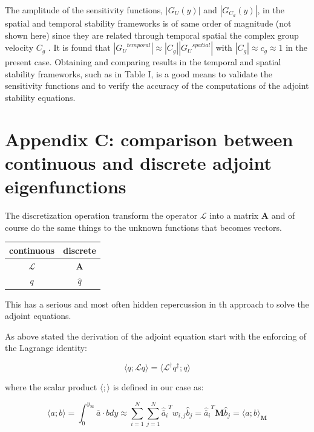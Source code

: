The amplitude of the sensitivity functions, $|G_{U} ( y)|$ and $|G_{C_d} (y)|$, in the spatial and temporal
stability frameworks is of same order of magnitude (not shown here) since they are related through
temporal spatial the complex group velocity $C_g$ . It is found that $|{G_U}^{temporal}| \approx |C_g ||{G_U}^{spatial}|$ with $|C_g | \approx c_g \approx 1$ in the
present case.
Obtaining and comparing results in the temporal and spatial stability frameworks, such as in
Table I, is a good means to validate the sensitivity functions and to verify the accuracy of the
computations of the adjoint stability equations.


\section*{Appendix C: comparison between continuous and discrete adjoint eigenfunctions}

The discretization operation transform the operator $\mathcal{L}$ into a matrix $\mathbf{A}$ and of course do the same things to the unknown functions that becomes vectors.

\begin{table}[H]
	\begin{center}
		\begin{tabular}{|c|c|}
			\hline 
			continuous & discrete \\ 
			\hline 
			$\mathcal{L}$ & $\mathbf{A}$ \\ 
			\hline 
			$q$ & $\hat{q}$ \\ 
			\hline 
		\end{tabular} 
	\end{center}
\end{table}

This has a serious and most often hidden repercussion in th approach to solve the adjoint equations.

As above stated the derivation of the adjoint equation start with the enforcing of the Lagrange identity:

\begin{equation}
\langle q; \mathcal{L} q \rangle = \langle {\mathcal{L}}^{\dagger} q^{\dagger} ; q \rangle
\end{equation}

where the scalar product $ \langle ;\rangle$ is defined in our case as:

\begin{equation}
\langle a ; b\rangle = \int_{0}^{y_{\infty}} \overline{a} \cdot b dy \approx \sum_{i=1}^N \sum_{j=1}^N {\hat{\overline{a}}_i}^T w_{i,j} {\hat{b}_j} = {\hat{\overline{a}}_i}^T \mathbf{M} {\hat{b}_j} =  \langle a ; b\rangle_{\mathbf{M}}
\label{eq:scalr_prod}
\end{equation}

